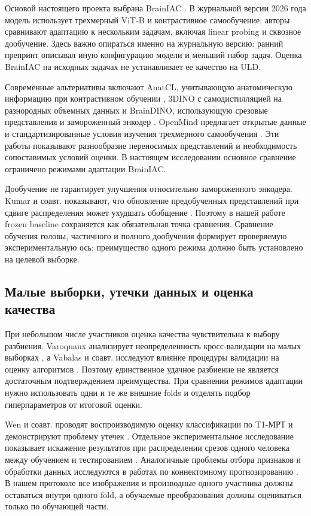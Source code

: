 \documentclass[11pt,a4paper]{article}
\begin{document}
Основой настоящего проекта выбрана BrainIAC \cite{ref09}. В журнальной версии 2026 года модель использует трехмерный ViT-B и контрастивное самообучение; авторы сравнивают адаптацию к нескольким задачам, включая linear probing и сквозное дообучение. Здесь важно опираться именно на журнальную версию: ранний препринт описывал иную конфигурацию модели и меньший набор задач. Оценка BrainIAC на исходных задачах не устанавливает ее качество на ULD.

Современные альтернативы включают AnatCL, учитывающую анатомическую информацию при контрастивном обучении \cite{ref11}, 3DINO с самодистилляцией на разнородных объемных данных \cite{ref12} и BrainDINO, использующую срезовые представления и замороженный энкодер \cite{ref13}. OpenMind предлагает открытые данные и стандартизированные условия изучения трехмерного самообучения \cite{ref14}. Эти работы показывают разнообразие переносимых представлений и необходимость сопоставимых условий оценки. В настоящем исследовании основное сравнение ограничено режимами адаптации BrainIAC.

Дообучение не гарантирует улучшения относительно замороженного энкодера. Kumar и соавт. показывают, что обновление предобученных представлений при сдвиге распределения может ухудшать обобщение \cite{ref19}. Поэтому в нашей работе frozen baseline сохраняется как обязательная точка сравнения. Сравнение обучения головы, частичного и полного дообучения формирует проверяемую экспериментальную ось; преимущество одного режима должно быть установлено на целевой выборке.

\subsection{Малые выборки, утечки данных и оценка качества}

При небольшом числе участников оценка качества чувствительна к выбору разбиения. Varoquaux анализирует неопределенность кросс-валидации на малых выборках \cite{ref20}, а Vabalas и соавт. исследуют влияние процедуры валидации на оценку алгоритмов \cite{ref24}. Поэтому единственное удачное разбиение не является достаточным подтверждением преимущества. При сравнении режимов адаптации нужно использовать одни и те же внешние folds и отделять подбор гиперпараметров от итоговой оценки.

Wen и соавт. проводят воспроизводимую оценку классификации по T1-МРТ и демонстрируют проблему утечек \cite{ref21}. Отдельное экспериментальное исследование показывает искажение результатов при распределении срезов одного человека между обучением и тестированием \cite{ref27}. Аналогичные проблемы отбора признаков и обработки данных исследуются в работах по коннектомному прогнозированию \cite{ref22}. В нашем протоколе все изображения и производные одного участника должны оставаться внутри одного fold, а обучаемые преобразования должны оцениваться только по обучающей части.
\end{document}
